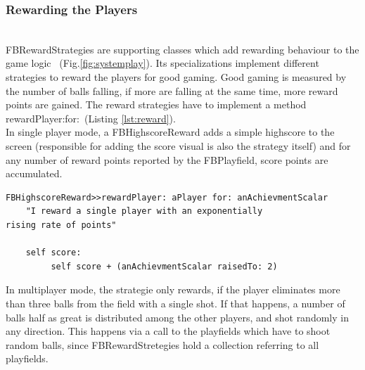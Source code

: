\subsubsection{Rewarding the Players} ~\\
FBRewardStrategies are supporting classes which add rewarding behaviour 
to the game logic
~(Fig.\ref{fig:systemplay}). Its specializations 
implement different strategies to
reward the players for good gaming. Good gaming is measured by the 
number of balls falling, if more are falling at the same time, more 
reward points are gained.
The reward strategies have to implement a method
rewardPlayer:for:~(Listing \ref{lst:reward}).\\
In single player mode, a FBHighscoreReward
adds a simple highscore to the screen (responsible for adding the 
score visual is also the strategy itself) and for any number of 
reward points reported by the FBPlayfield, score points are accumulated.
%
\begin{lstlisting}[float,label=lst:reward,caption=The Highscore Calculation Method]
FBHighscoreReward>>rewardPlayer: aPlayer for: anAchievmentScalar
    "I reward a single player with an exponentially 
rising rate of points" 

    self score:
         self score + (anAchievmentScalar raisedTo: 2)
\end{lstlisting}
%
In multiplayer mode, the strategie only rewards, if the player eliminates 
more than three balls from the field with a single shot. If that happens, 
a number of balls half as great is distributed among the other players,
and shot randomly in any direction. This happens via a call to 
the playfields which have to shoot random balls, since FBRewardStretegies
hold a collection referring to all playfields.
%
